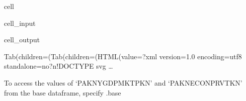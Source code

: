 \documentclass[letterpaper,10pt,english]{jupyterBook}
\begin{document}
\begin{sphinxuseclass}{cell}\begin{sphinxVerbatimInput}

\begin{sphinxuseclass}{cell_input}
\begin{sphinxVerbatim}[commandchars=\\\{\}]
\PYG{p}{[}\PYG{p}{]} 
\end{sphinxVerbatim}

\end{sphinxuseclass}\end{sphinxVerbatimInput}
\begin{sphinxVerbatimOutput}

\begin{sphinxuseclass}{cell_output}
\begin{sphinxVerbatim}[commandchars=\\\{\}]
Tab(children=(Tab(children=(HTML(value=\PYGZsq{}\PYGZlt{}?xml version=\PYGZdq{}1.0\PYGZdq{} encoding=\PYGZdq{}utf\PYGZhy{}8\PYGZdq{} standalone=\PYGZdq{}no\PYGZdq{}?\PYGZgt{}\PYGZbs{}n\PYGZlt{}!DOCTYPE svg …
\end{sphinxVerbatim}

\begin{sphinxVerbatim}[commandchars=\\\{\}]

\end{sphinxVerbatim}

\end{sphinxuseclass}\end{sphinxVerbatimOutput}

\end{sphinxuseclass}
\sphinxAtStartPar
To access the values of ‘PAKNYGDPMKTPKN’ and ‘PAKNECONPRVTKN’ from the base dataframe, specify .base
\end{document}
